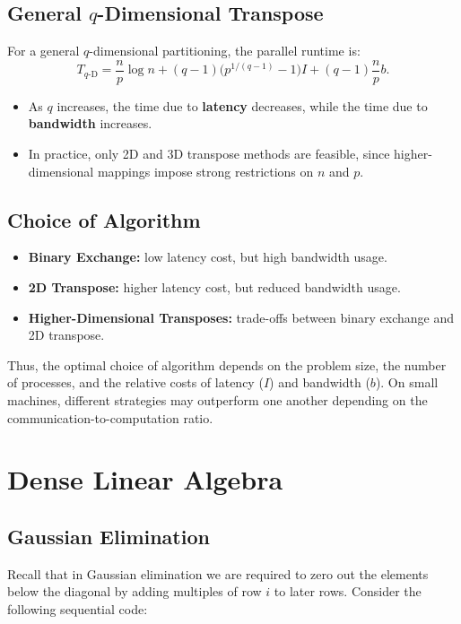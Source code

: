 \documentclass[12pt]{book}
\begin{document}
\subsection*{General $q$-Dimensional Transpose}
For a general $q$-dimensional partitioning, the parallel runtime is:
\[
T_{q\text{-D}} = \frac{n}{p}\log n + (q-1)\big(p^{1/(q-1)}-1\big)I + (q-1)\frac{n}{p}b.
\]

\begin{itemize}
    \item As $q$ increases, the time due to \textbf{latency} decreases, while the time due to \textbf{bandwidth} increases. 
    \item In practice, only 2D and 3D transpose methods are feasible, since higher-dimensional mappings impose strong restrictions on $n$ and $p$.
\end{itemize}

\subsection*{Choice of Algorithm}
\begin{itemize}
    \item \textbf{Binary Exchange:} low latency cost, but high bandwidth usage.
    \item \textbf{2D Transpose:} higher latency cost, but reduced bandwidth usage.
    \item \textbf{Higher-Dimensional Transposes:} trade-offs between binary exchange and 2D transpose.
\end{itemize}

Thus, the optimal choice of algorithm depends on the problem size, the number of processes, and the relative costs of latency ($I$) and bandwidth ($b$). On small machines, different strategies may outperform one another depending on the communication-to-computation ratio.




\section{Dense Linear Algebra}
\subsection{Gaussian Elimination}
Recall that in Gaussian elimination we are required to zero out the elements below the diagonal by adding multiples of row $i$ to later rows. Consider the following sequential code:
\end{document}
